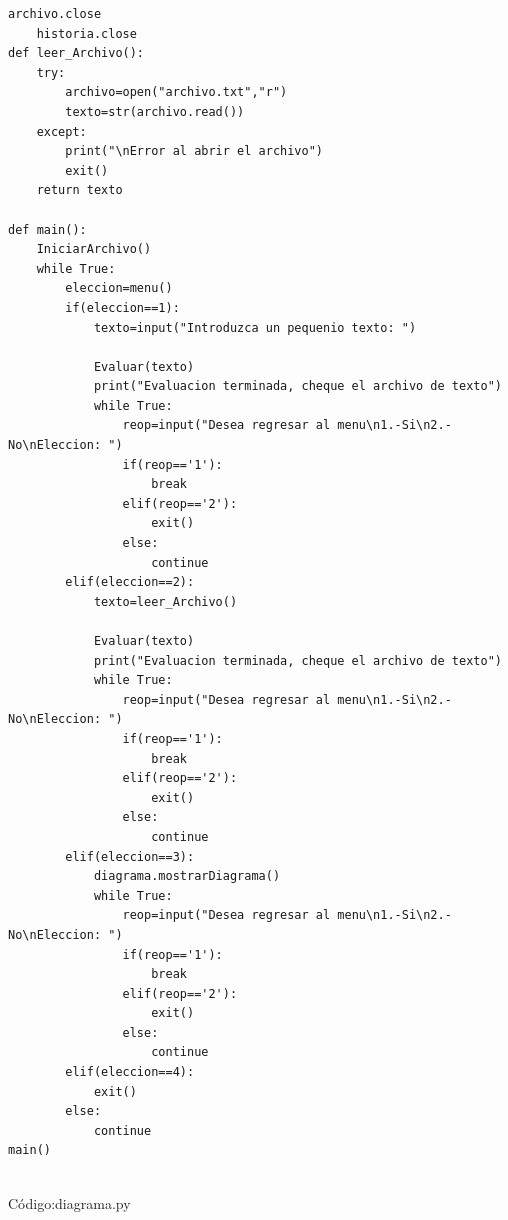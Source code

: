 \begin{lstlisting}[frame=single]
    archivo.close
    historia.close
def leer_Archivo():
    try:
        archivo=open("archivo.txt","r")
        texto=str(archivo.read())
    except:
        print("\nError al abrir el archivo")
        exit()
    return texto

def main():
    IniciarArchivo()
    while True:
        eleccion=menu()
        if(eleccion==1):
            texto=input("Introduzca un pequenio texto: ")

            Evaluar(texto)
            print("Evaluacion terminada, cheque el archivo de texto")
            while True:
                reop=input("Desea regresar al menu\n1.-Si\n2.-No\nEleccion: ")
                if(reop=='1'):
                    break
                elif(reop=='2'):
                    exit()
                else:
                    continue
        elif(eleccion==2):
            texto=leer_Archivo()

            Evaluar(texto)
            print("Evaluacion terminada, cheque el archivo de texto")
            while True:
                reop=input("Desea regresar al menu\n1.-Si\n2.-No\nEleccion: ")
                if(reop=='1'):
                    break
                elif(reop=='2'):
                    exit()
                else:
                    continue
        elif(eleccion==3):
            diagrama.mostrarDiagrama()
            while True:
                reop=input("Desea regresar al menu\n1.-Si\n2.-No\nEleccion: ")
                if(reop=='1'):
                    break
                elif(reop=='2'):
                    exit()
                else:
                    continue
        elif(eleccion==4):
            exit()
        else:
            continue
main()


\end{lstlisting}
\vspace{1.5cm}
C\'odigo:diagrama.py


